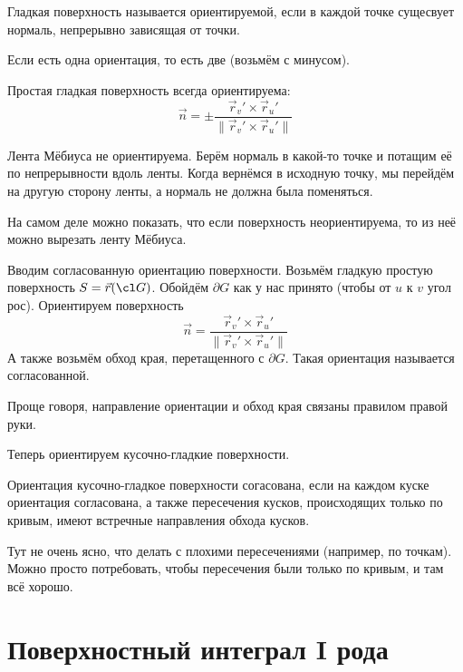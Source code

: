 \begin{Def}
	Гладкая поверхность называется ориентируемой, если в каждой точке сущесвует нормаль, непрерывно зависящая от точки.
\end{Def}

\begin{Rem}
	Если есть одна ориентация, то есть две (возьмём с минусом).
\end{Rem}

\begin{Rem}
	Простая гладкая поверхность всегда ориентируема:
	\[ \vec n = \pm \frac{\vec r_v' \times \vec r_u'}{\|\vec r_v' \times \vec r_u'\|} \]
\end{Rem}

\begin{Rem}
	Лента Мёбиуса не ориентируема.
	Берём нормаль в какой-то точке и потащим её по непрерывности вдоль ленты.
	Когда вернёмся в исходную точку, мы перейдём на другую сторону ленты, а нормаль не должна была поменяться.

	На самом деле можно показать, что если поверхность неориентируема, то из неё можно вырезать ленту Мёбиуса.
\end{Rem}

\begin{Def}
	Вводим согласованную ориентацию поверхности.
	Возьмём гладкую простую поверхность $S = \vec r(\cl G)$.
	Обойдём $\partial G$ как у нас принято (чтобы от $u$ к $v$ угол рос).
	Ориентируем поверхность
	\[ \vec n = \frac{\vec r_v' \times \vec r_u'}{\|\vec r_v' \times \vec r_u'\|} \]
	А также возьмём обход края, перетащенного с $\partial G$.
	Такая ориентация называется согласованной.

	Проще говоря, направление ориентации и обход края связаны правилом правой руки.
\end{Def}

Теперь ориентируем кусочно-гладкие поверхности.

\begin{Def}
	Ориентация кусочно-гладкое поверхности согасована, если на каждом куске ориентация согласована,
	а также пересечения кусков, происходящих только по кривым, имеют встречные направления обхода кусков.
\end{Def}

Тут не очень ясно, что делать с плохими пересечениями (например, по точкам).
Можно просто потребовать, чтобы пересечения были только по кривым, и там всё хорошо.

\section{Поверхностный интеграл I рода}

